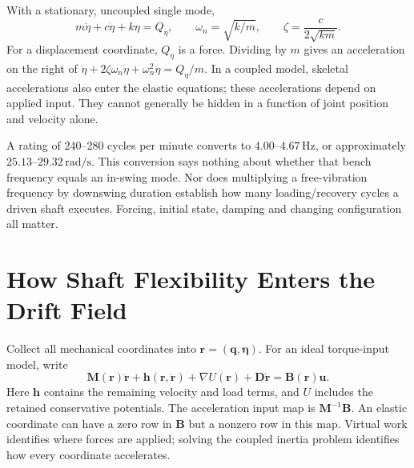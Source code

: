 With a stationary, uncoupled single mode,
\[
m\ddot\eta+c\dot\eta+k\eta=Q_\eta,
\qquad \omega_n=\sqrt{k/m},\qquad \zeta=\frac{c}{2\sqrt{km}}.
\]
For a displacement coordinate, $Q_\eta$ is a force. Dividing by $m$ gives an acceleration on the right of $\ddot\eta+2\zeta\omega_n\dot\eta+\omega_n^2\eta=Q_\eta/m$. In a coupled model, skeletal accelerations also enter the elastic equations; these accelerations depend on applied input. They cannot generally be hidden in a function of joint position and velocity alone.

A rating of 240--280 cycles per minute converts to $4.00$--$4.67\,\mathrm{Hz}$, or approximately $25.13$--$29.32\,\mathrm{rad/s}$. This conversion says nothing about whether that bench frequency equals an in-swing mode. Nor does multiplying a free-vibration frequency by downswing duration establish how many loading/recovery cycles a driven shaft executes. Forcing, initial state, damping and changing configuration all matter.

\section{How Shaft Flexibility Enters the Drift Field}
Collect all mechanical coordinates into $\mathbf r=(\mathbf q,\boldsymbol\eta)$. For an ideal torque-input model, write
\[
\mathbf M(\mathbf r)\ddot{\mathbf r}+\mathbf h(\mathbf r,\dot{\mathbf r})
+\nabla U(\mathbf r)+\mathbf D\dot{\mathbf r}
=\mathbf B(\mathbf r)\mathbf u.
\]
Here $\mathbf h$ contains the remaining velocity and load terms, and $U$ includes the retained conservative potentials. The acceleration input map is $\mathbf M^{-1}\mathbf B$. An elastic coordinate can have a zero row in $\mathbf B$ but a nonzero row in this map. Virtual work identifies where forces are applied; solving the coupled inertia problem identifies how every coordinate accelerates.

